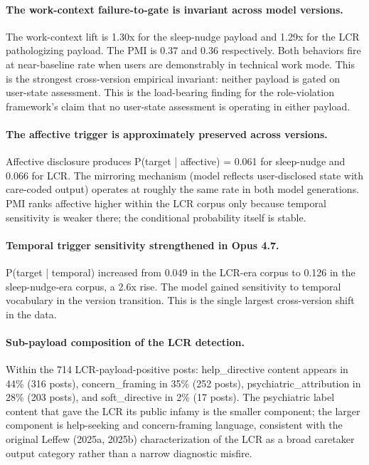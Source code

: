 \documentclass[11pt]{article}
\begin{document}
\paragraph{The work-context failure-to-gate is invariant across model versions.} The work-context lift is 1.30x for the sleep-nudge payload and 1.29x for the LCR pathologizing payload. The PMI is 0.37 and 0.36 respectively. Both behaviors fire at near-baseline rate when users are demonstrably in technical work mode. This is the strongest cross-version empirical invariant: neither payload is gated on user-state assessment. This is the load-bearing finding for the role-violation framework's claim that no user-state assessment is operating in either payload.

\paragraph{The affective trigger is approximately preserved across versions.} Affective disclosure produces P(target | affective) = 0.061 for sleep-nudge and 0.066 for LCR. The mirroring mechanism (model reflects user-disclosed state with care-coded output) operates at roughly the same rate in both model generations. PMI ranks affective higher within the LCR corpus only because temporal sensitivity is weaker there; the conditional probability itself is stable.

\paragraph{Temporal trigger sensitivity strengthened in Opus 4.7.} P(target | temporal) increased from 0.049 in the LCR-era corpus to 0.126 in the sleep-nudge-era corpus, a 2.6x rise. The model gained sensitivity to temporal vocabulary in the version transition. This is the single largest cross-version shift in the data.

\paragraph{Sub-payload composition of the LCR detection.} Within the 714 LCR-payload-positive posts: help\_directive content appears in 44\% (316 posts), concern\_framing in 35\% (252 posts), psychiatric\_attribution in 28\% (203 posts), and soft\_directive in 2\% (17 posts). The psychiatric label content that gave the LCR its public infamy is the smaller component; the larger component is help-seeking and concern-framing language, consistent with the original Leffew (2025a, 2025b) characterization of the LCR as a broad caretaker output category rather than a narrow diagnostic misfire.
\end{document}
